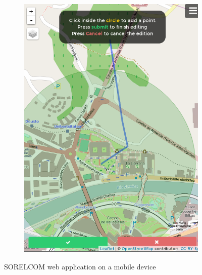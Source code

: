 \begin{figure}[ht]
\begin{subfigure}{.45\textwidth}
    \includegraphics[width=.8\textwidth]{fig/responsive2}
  \end{subfigure}  
  \caption{SORELCOM web application on a mobile device}
  \label{fig:mobile-web}
\end{figure} 